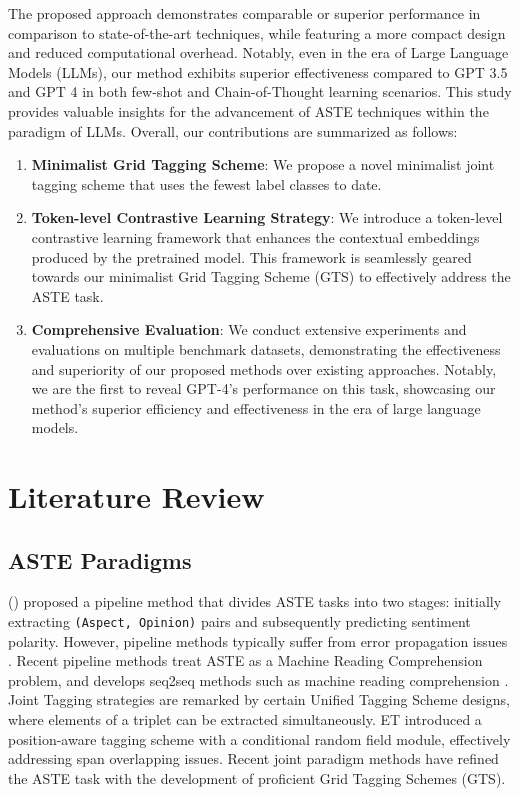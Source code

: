 \documentclass[11pt]{article}
\begin{document}
The proposed approach demonstrates comparable or superior performance in comparison to state-of-the-art techniques, while featuring a more compact design and reduced computational overhead. Notably, even in the era of Large Language Models (LLMs), our method exhibits superior effectiveness compared to GPT 3.5 and GPT 4 in both few-shot and Chain-of-Thought \cite{wei2022chain} learning scenarios. This study provides valuable insights for the advancement of ASTE techniques within the paradigm of LLMs. Overall, our contributions are summarized as follows:

\vspace{-2mm}
\begin{enumerate}
    \item \textbf{Minimalist Grid Tagging Scheme}: We propose a novel minimalist joint tagging scheme that uses the fewest label classes to date.
    \vspace{-3mm}
    \item \textbf{Token-level Contrastive Learning Strategy}: We introduce a token-level contrastive learning framework that enhances the contextual embeddings produced by the pretrained model. This framework is seamlessly geared towards our minimalist Grid Tagging Scheme (GTS) to effectively address the ASTE task. 
    \vspace{-3mm}
    \item \textbf{Comprehensive Evaluation}: 
    We conduct extensive experiments and evaluations on multiple benchmark datasets, demonstrating the effectiveness and superiority of our proposed methods over existing approaches. Notably, we are the first to reveal GPT-4's performance on this task, showcasing our method’s superior efficiency and effectiveness in the era of large language models.
\end{enumerate}


\section{Literature Review}
\subsection{ASTE Paradigms}
\citeauthor{peng2020knowing} (\citeyear{peng2020knowing}) proposed a pipeline method that divides ASTE tasks into two stages: initially extracting \texttt{(Aspect, Opinion)} pairs and subsequently predicting sentiment polarity. However, pipeline methods typically suffer from error propagation issues \cite{xu2020position}. Recent pipeline methods treat ASTE as a Machine Reading Comprehension problem, and develops seq2seq methods such as machine reading comprehension \cite{zhai2022mrc, mao2021joint, zou2024multi, chen2021semantic}. 
Joint Tagging strategies are remarked by certain Unified Tagging Scheme designs, where elements of a triplet can be extracted simultaneously. ET \cite{xu2020position} introduced a position-aware tagging scheme with a conditional random field module, effectively addressing span overlapping issues.
Recent joint paradigm methods have refined the ASTE task with the development of proficient Grid Tagging Schemes (GTS).
\end{document}
